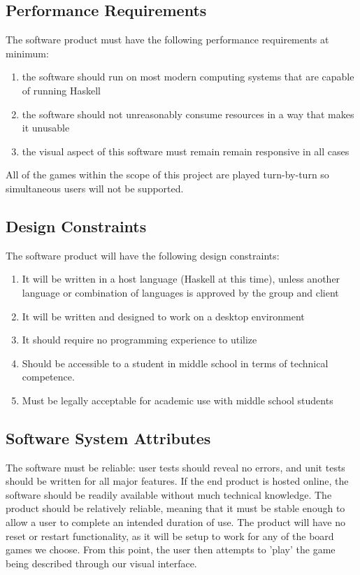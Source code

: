 \documentclass[10pt,letter,draftclsnofoot,onecolumn]{IEEEtran}
\begin{document}
\begin{singlespace}
    \subsection{Performance Requirements}
        The software product must have the following performance requirements at minimum:
        \begin{enumerate}
            \item the software should run on most modern computing systems that are capable of running Haskell
            \item the software should not unreasonably consume resources in a way that makes it unusable
            \item the visual aspect of this software must remain remain responsive in all cases
        \end{enumerate}
        
        All of the games within the scope of this project are played turn-by-turn so simultaneous users will not be supported. 
    \subsection{Design Constraints}
        The software product will have the following design constraints:
        \begin{enumerate}
            \item It will be written in a host language (Haskell at this time), unless another language or combination of languages is approved by the group and client
            \item It will be written and designed to work on a desktop environment
            \item It should require no programming experience to utilize
            \item Should be accessible to a student in middle school in terms of technical competence.
            \item Must be legally acceptable for academic use with middle school students
        \end{enumerate}
    \subsection{Software System Attributes}
        The software must be reliable: user tests should reveal no errors, and unit tests should be written for all major features. If the end product is hosted online, the software should be readily available without much technical knowledge. The product should be relatively reliable, meaning that it must be stable enough to allow a user to complete an intended duration of use. The product will have no reset or restart functionality, as it will be setup to work for any of the board games we choose. From this point, the user then attempts to 'play' the game being described through our visual interface.
        

\end{singlespace}
\end{document}
